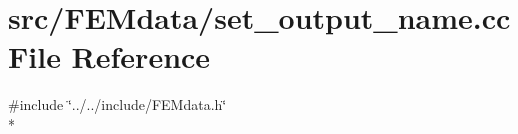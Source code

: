 \section{src/\-F\-E\-Mdata/set\-\_\-output\-\_\-name.cc File Reference}
\label{set__output__name_8cc}
{\ttfamily \#include \char`\"{}../../include/\-F\-E\-Mdata.\-h\char`\"{}}\\*
